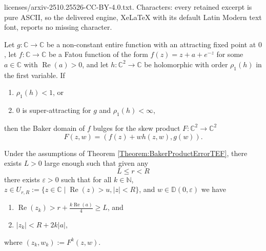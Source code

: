 \documentclass[10pt,a4paper]{amsart}
\newcommand{\D}{{\mathbb D}}
\renewcommand{\Re}{\operatorname{Re}}
\begin{document}
licenses/arxiv-2510.25526-CC-BY-4.0.txt. Characters: every retained excerpt is pure ASCII, so the delivered engine, XeLaTeX with its default Latin Modern text font, reports no missing character.
\begin{thm}\label{Theorem:BakerProductErrorTEF}
	Let $g : \mathbb{C}\to\mathbb{C}$ be a non-constant entire function with an attracting fixed point at $0$, let $f : \mathbb{C} \to \mathbb{C}$ be a Fatou function of the form $f(z) = z + a + e^{-z}$ for some $a \in \mathbb{C} $ with $\Re(a) > 0$, and let $h : \mathbb{C}^2 \to \mathbb{C}$ be holomorphic with order $\rho_1(h)$ in the first variable. If 
	\begin{enumerate}
		\item $\rho_1(h) < 1$, or
		\item $0$ is super-attracting for $g$ and $\rho_1(h) < \infty$,
	\end{enumerate}
	then the Baker domain of $f$ bulges for the skew product $F : \mathbb{C}^2 \to \mathbb{C}^2$
	\begin{equation*}
		F(z,w) = (f(z) + wh(z,w), g(w)).
	\end{equation*}	
\end{thm}

\begin{lem}\label{Lemma:Baker:RealPartToInftyVar2}
	Under the assumptions of Theorem \ref{Theorem:BakerProductErrorTEF}, there exists $L > 0$ large enough such that given any 
	\begin{equation*} 
		L \leq r < R 
	\end{equation*}
	there exists $\varepsilon >0 $ such that for all $k\in\mathbb{N}$, $z \in U_{r,R} := \lbrace z \in \mathbb{C} \mid \Re(z)>u, \lvert z \rvert < R \rbrace$, and $w \in \D(0,\varepsilon)$ we have
	\begin{enumerate}%
		\item $\Re(z_k)>  r + \frac{k\Re(a)}{4} \ge L$, and \label{Lemma:Baker:RealPartToInftyVar2:ProofProp1}
		\item $ \lvert z_k \rvert < R + 2k \lvert a \rvert$, \label{Lemma:Baker:RealPartToInftyVar2:ProofProp2}
	\end{enumerate}
	where $(z_k, w_k) := F^k(z,w)$.
\end{lem}
\end{document}
